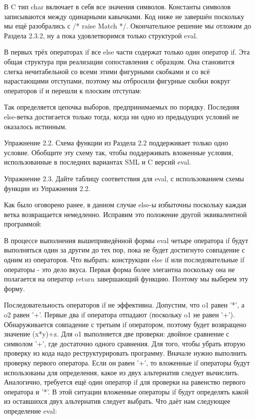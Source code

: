 В C тип char включает в себя все значения символов. Константы символов записываются между одинарными кавычками. Код ниже не завершён поскольку мы ещё разобрались с /* raise Match */. Окончательное решение мы отложим до Раздела 2.3.2, ну а пока удовлетворимся только структурой eval.

В первых трёх операторах if все else части содержат только один оператор if. Эта общая структура при реализации сопоставления с образцом. Она становится слегка нечитабельной со всеми этими фигурными скобками и со всё нарастающими отступами, поэтому мы отбросили фигурные скобки вокруг операторов if и перешли к плоским отступам:

Так определяется цепочка выборов, предпринимаемых по порядку. Последняя else-ветка достигается только тогда, когда ни одно из предыдущих условий не оказалось истинным.

Упражнение 2.2. Схема функции из Раздела 2.2 поддерживает только одно условие. Обобщите эту схему так, чтобы поддерживать вложенные условия, использованные в последних вариантах SML и C версий eval.

Упражнение 2.3. Дайте таблицу соответствия для eval, с использованием схемы функции из Упражнения 2.2.

Как было оговорено ранее, в данном случае else-ы избыточны поскольку каждая ветка возвращается немедленно. Исправим это положение другой эквивалентной программой:

В процессе выполнения вышеприведённой формы eval четыре оператора if будут выполняться один за другим до тех пор, пока не будет достигнуто совпадение с одним из операторов. Что выбрать: конструкции else if или последовательные if операторы - это дело вкуса. Первая форма более элегантна поскольку она не полагается на оператор return завершающий функцию. Поэтому мы выберем эту форму.

Последовательность операторов if не эффективна. Допустим, что o1 равен '*', а o2 равен '+'. Первые два if оператора отпадают (поскольку o1 не равен '+'). Обнаруживается совпадение с третьим if оператором, поэтому будет возвращено значение (x*y)+z. Для o1 выполняется две проверки: двойное сравнение с символом '+', где достаточно одного сравнения. Для того, чтобы убрать вторую проверку из кода надо реструктурировать программу. Вначале нужно выполнить проверку первого оператора. Если он равен '+', то вложенные if операторы будут использованы для определения, какое из двух альтернатив следует вычислить. Аналогично, требуется ещё один оператор if для проверки на равенство первого оператора и '*'. В этой ситуации вложенные операторы if будут определять какой из оставшихся двух альтернатив следует выбрать. Что даёт нам следующее определение eval:

